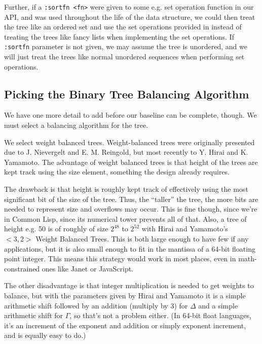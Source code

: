 \documentclass[sigconf]{acmart}
\begin{document}
Further, if a \texttt{:sortfn <fn>} were given to some e.g. set operation
function in our API, and was used throughout the life of the data structure, we
could then treat the tree like an ordered set and use the set operations
provided in \cite{DBLP:journals/corr/BlellochFS16} instead of treating the trees
like fancy lists when implementing the set operations. If \texttt{:sortfn}
parameter is not given, we may assume the tree is unordered, and we will just
treat the trees like normal unordered sequences when performing set operations.

\subsection{Picking the Binary Tree Balancing Algorithm}

We have one more detail to add before our baseline can be complete, though. We
must select a balancing algorithm for the tree.

We select weight balanced trees. Weight-balanced trees were originally presented
due to J. Nievergelt and E. M. Reingold\cite{doi:10.1137/0202005}, but most
recently to Y. Hirai and K. Yamamoto\cite{HIRAI_YAMAMOTO_2011}. The advantage of
weight balanced trees is that height of the trees are kept track using the size
element, something the design already requires.

The drawback is that height is
roughly kept track of effectively using the most significant bit of the size of
the tree. Thus, the ``taller'' the tree, the more bits are needed to represent
size and overflows may occur. This is fine though, since we're in Common Lisp,
since its numerical tower prevents all of that. Also, a tree of height e.g. 50
is of roughly of size $2^48$ to $2^52$ with Hirai and Yamamoto's $<3,2>$ Weight
Balanced Trees. This is both large enough to have few if any applications, but
it is also small enough to fit in the mantissa of a 64-bit floating point
integer. This means this strategy would work in most places, even in
math-constrained ones like Janet\cite{Janet} or JavaScript.

The other disadvantage is that integer multiplication is needed to get weights
to balance, but with the parameters given by Hirai and Yamamoto it is a simple
arithmetic shift followed by an addition (multiply by $3$) for $\Delta$ and a
simple arithmetic shift for $\Gamma$, so that's not a problem either. (In 64-bit
float languages, it's an increment of the exponent and addition or simply
exponent increment, and is equally easy to do.)
\end{document}
